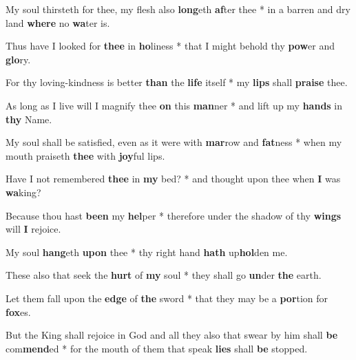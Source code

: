 \begin{multicols}{2}
	My soul thirsteth for thee, my flesh also \textbf{long}eth \textbf{af}ter thee * in a barren and dry land \textbf{where} no \textbf{wa}ter is.
	
	Thus have I looked for \textbf{thee} in \textbf{ho}liness * that I might behold thy \textbf{pow}er and \textbf{glo}ry.
	
	For thy loving-kindness is better \textbf{than} the \textbf{life} itself * my \textbf{lips} shall \textbf{praise} thee.
	
	As long as I live will I magnify thee \textbf{on} this \textbf{man}ner * and lift up my \textbf{hands} in \textbf{thy} Name.
	
	My soul shall be satisfied, even as it were with \textbf{mar}row and \textbf{fat}ness * when my mouth praiseth \textbf{thee} with \textbf{joy}ful lips.
	
	Have I not remembered \textbf{thee} in \textbf{my} bed? * and thought upon thee when \textbf{I} was \textbf{wa}king?
	
	Because thou hast \textbf{been} my \textbf{hel}per * therefore under the shadow of thy \textbf{wings} will \textbf{I} rejoice.
	
	My soul \textbf{hang}eth \textbf{upon} thee * thy right hand \textbf{hath} up\textbf{hol}den me.
	
	These also that seek the \textbf{hurt} of \textbf{my} soul * they shall go \textbf{un}der \textbf{the} earth.
	
	Let them fall upon the \textbf{edge} of \textbf{the} sword * that they may be a \textbf{por}tion for \textbf{fox}es.
	
	But the King shall rejoice in God and all they also that swear by him shall \textbf{be} com\textbf{mend}ed * for the mouth of them that speak \textbf{lies} shall \textbf{be} stopped.
\end{multicols}